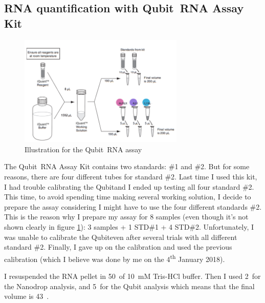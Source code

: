 \subsection{RNA quantification with Qubit\texttrademark ~RNA Assay Kit}
\label{task:20180113_cj2}

\begin{figure}[H]
    \centering
    \caption{Illustration for the Qubit\texttrademark ~RNA assay}
    \label{fig:20180113_rna_qubit}
    \includegraphics[width=0.7\textwidth]{graphics/schemas/20180113_rna_qubit.png}
\end{figure}


The Qubit\texttrademark ~RNA Assay Kit contains two standards: \#1 and \#2. But for some reasons, there are four different tubes for standard \#2. Last time I used this kit, I had trouble calibrating the Qubit\texttrademark and I ended up testing all four standard \#2. This time, to avoid spending time making several working solution, I decide to prepare the assay considering I might have to use the four different standards \#2. This is the reason why I prepare my assay for 8 samples (even though it's not shown clearly in figure \ref{fig:20180113_rna_qubit}): 3 samples + 1 STD\#1 + 4 STD\#2. Unfortunately, I was unable to calibrate the Qubit\texttrademark even after several trials with all different standard \#2. Finally, I gave up on the calibration and used the previous calibration (which I believe was done by me on the 4\textsuperscript{th} January 2018).

I resuspended the RNA pellet in 50~\uL of 10~mM Tris-HCl buffer. Then I used 2~\uL for the Nanodrop analysis, and 5~\uL for the Qubit analysis which means that the final volume is 43~\uL. 

